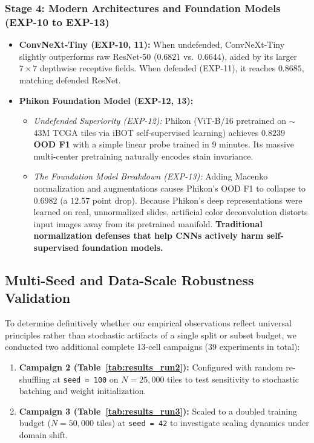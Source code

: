 \documentclass[11pt,a4paper]{article}
\begin{document}
\subsubsection*{Stage 4: Modern Architectures and Foundation Models (EXP-10 to EXP-13)}
\begin{itemize}[leftmargin=*,itemsep=1pt]
  \item \textbf{ConvNeXt-Tiny (EXP-10, 11):} When undefended, ConvNeXt-Tiny slightly outperforms raw ResNet-50 ($0.6821$ vs.\ $0.6644$), aided by its larger $7\times 7$ depthwise receptive fields. When defended (EXP-11), it reaches $0.8685$, matching defended ResNet.
  \item \textbf{Phikon Foundation Model (EXP-12, 13):}
    \begin{itemize}[leftmargin=*,itemsep=1pt]
      \item \textit{Undefended Superiority (EXP-12):} Phikon (ViT-B/16 pretrained on $\sim$43M TCGA tiles via iBOT self-supervised learning) achieves \textbf{$0.8239$ OOD F1} with a simple linear probe trained in 9 minutes. Its massive multi-center pretraining naturally encodes stain invariance.
      \item \textit{The Foundation Model Breakdown (EXP-13):} Adding Macenko normalization and augmentations causes Phikon's OOD F1 to collapse to \textbf{$0.6982$} (a $12.57$ point drop). Because Phikon's deep representations were learned on real, unnormalized slides, artificial color deconvolution distorts input images away from its pretrained manifold. \textbf{Traditional normalization defenses that help CNNs actively harm self-supervised foundation models.}
    \end{itemize}
\end{itemize}

\subsection{Multi-Seed and Data-Scale Robustness Validation}
To determine definitively whether our empirical observations reflect universal principles rather than stochastic artifacts of a single split or subset budget, we conducted two additional complete 13-cell campaigns (39 experiments in total):
\begin{enumerate}[leftmargin=*,itemsep=1pt]
  \item \textbf{Campaign 2 (Table~\ref{tab:results_run2}):} Configured with random re-shuffling at \texttt{seed = 100} on $N = 25{,}000$ tiles to test sensitivity to stochastic batching and weight initialization.
  \item \textbf{Campaign 3 (Table~\ref{tab:results_run3}):} Scaled to a doubled training budget ($N = 50{,}000$ tiles) at \texttt{seed = 42} to investigate scaling dynamics under domain shift.
\end{enumerate}
\end{document}

